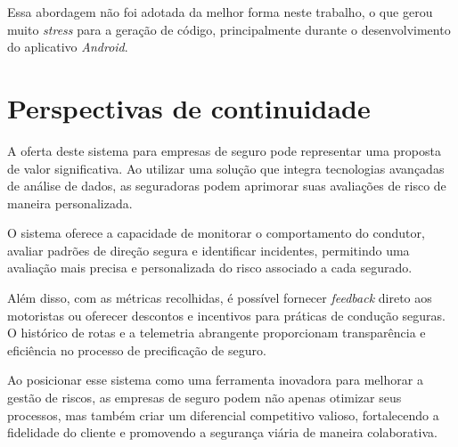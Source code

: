     Essa abordagem não foi adotada da melhor forma neste trabalho, o que gerou muito \textit{stress} para a geração de código, principalmente durante o desenvolvimento do aplicativo \textit{Android}.

\section{Perspectivas de continuidade}
A oferta deste sistema para empresas de seguro pode representar uma proposta de valor significativa. Ao utilizar uma solução que integra tecnologias avançadas de análise de dados, as seguradoras podem aprimorar suas avaliações de risco de maneira personalizada. 

O sistema oferece a capacidade de monitorar o comportamento do condutor, avaliar padrões de direção segura e identificar incidentes, permitindo uma avaliação mais precisa e personalizada do risco associado a cada segurado. 

Além disso, com as métricas recolhidas, é possível fornecer \textit{feedback} direto aos motoristas ou oferecer descontos e incentivos para práticas de condução seguras. O histórico de rotas e a telemetria abrangente proporcionam transparência e eficiência no processo de precificação de seguro. 

Ao posicionar esse sistema como uma ferramenta inovadora para melhorar a gestão de riscos, as empresas de seguro podem não apenas otimizar seus processos, mas também criar um diferencial competitivo valioso, fortalecendo a fidelidade do cliente e promovendo a segurança viária de maneira colaborativa.